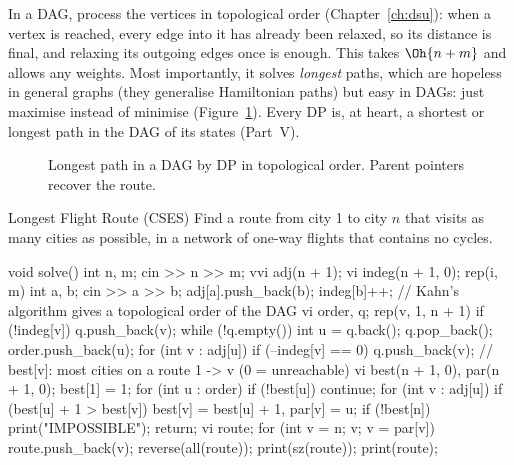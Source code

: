 In a DAG, process the vertices in topological order (Chapter~\ref{ch:dsu}): when a vertex is reached, every edge into it has
already been relaxed, so its distance is final, and relaxing its outgoing edges once is enough. This takes $\Oh{n + m}$ and
allows any weights. Most importantly, it solves \emph{longest} paths, which are hopeless in general graphs (they generalise
Hamiltonian paths) but easy in DAGs: just maximise instead of minimise (Figure~\ref{fig:dagpath}). Every DP is, at heart, a
shortest or longest path in the DAG of its states (Part~V).

\begin{figure}[htbp]
\centering
{}
\caption{Longest path in a DAG by DP in topological order. Parent pointers recover the route.}
\label{fig:dagpath}
\end{figure}

\begin{problem}{Longest Flight Route (CSES)}
Find a route from city 1 to city $n$ that visits as many cities as possible, in a network of one-way flights that contains no
cycles.
\end{problem}

\begin{code}
void solve() {
    int n, m;
    cin >> n >> m;
    vvi adj(n + 1);
    vi indeg(n + 1, 0);
    rep(i, m) {
        int a, b;
        cin >> a >> b;
        adj[a].push_back(b);
        indeg[b]++;
    }
    // Kahn's algorithm gives a topological order of the DAG
    vi order, q;
    rep(v, 1, n + 1) if (!indeg[v]) q.push_back(v);
    while (!q.empty()) {
        int u = q.back();
        q.pop_back();
        order.push_back(u);
        for (int v : adj[u])
            if (--indeg[v] == 0) q.push_back(v);
    }
    // best[v]: most cities on a route 1 -> v (0 = unreachable)
    vi best(n + 1, 0), par(n + 1, 0);
    best[1] = 1;
    for (int u : order) {
        if (!best[u]) continue;
        for (int v : adj[u])
            if (best[u] + 1 > best[v]) best[v] = best[u] + 1, par[v] = u;
    }
    if (!best[n]) {
        print("IMPOSSIBLE");
        return;
    }
    vi route;
    for (int v = n; v; v = par[v]) route.push_back(v);
    reverse(all(route));
    print(sz(route));
    print(route);
}
\end{code}

